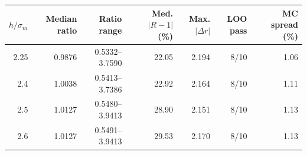 \begin{tabular}{rrrrrrr}
\toprule
$h/\sigma_m$ & Median ratio & Ratio range & Med. $|R-1|$ (\%) & Max. $|\Delta r|$ & LOO pass & MC spread (\%) \\
\midrule
2.25 & 0.9876 & 0.5332--3.7590 & 22.05 & 2.194 & 8/10 & 1.06 \\
2.4 & 1.0038 & 0.5413--3.7386 & 22.92 & 2.164 & 8/10 & 1.11 \\
2.5 & 1.0127 & 0.5480--3.9413 & 28.90 & 2.151 & 8/10 & 1.13 \\
2.6 & 1.0127 & 0.5491--3.9413 & 29.53 & 2.170 & 8/10 & 1.13 \\
\bottomrule
\end{tabular}
